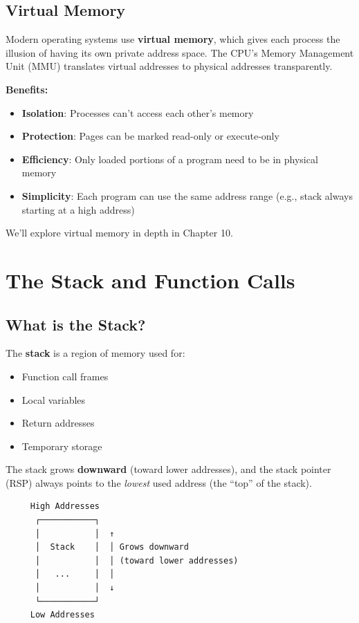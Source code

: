 \subsection{Virtual Memory}

Modern operating systems use \textbf{virtual memory}, which gives each process the illusion of having its own private address space. The CPU's Memory Management Unit (MMU) translates virtual addresses to physical addresses transparently.

\textbf{Benefits:}
\begin{itemize}
  \item \textbf{Isolation}: Processes can't access each other's memory
  \item \textbf{Protection}: Pages can be marked read-only or execute-only
  \item \textbf{Efficiency}: Only loaded portions of a program need to be in physical memory
  \item \textbf{Simplicity}: Each program can use the same address range (e.g., stack always starting at a high address)
\end{itemize}

We'll explore virtual memory in depth in Chapter 10.

\section{The Stack and Function Calls}

\subsection{What is the Stack?}

The \textbf{stack} is a region of memory used for:
\begin{itemize}
  \item Function call frames
  \item Local variables
  \item Return addresses
  \item Temporary storage
\end{itemize}

The stack grows \textbf{downward} (toward lower addresses), and the stack pointer (RSP) always points to the \emph{lowest} used address (the ``top'' of the stack).

\begin{verbatim}
     High Addresses
      ┌───────────┐
      │           │  ↑
      │  Stack    │  │ Grows downward
      │           │  │ (toward lower addresses)
      │   ...     │  │
      │           │  ↓
      └───────────┘
     Low Addresses
\end{verbatim}

